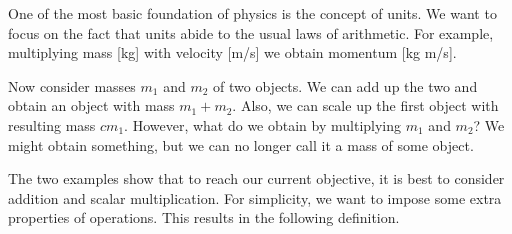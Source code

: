 \begin{example}
    \label{exm:vspintro2}
    One of the most basic foundation of physics is the concept of units.
    We want to focus on the fact that
    units abide to the usual laws of arithmetic.
    For example, multiplying mass [kg] with velocity [m/s]
    we obtain momentum [kg m/s].

    Now consider masses \(m_1\) and \(m_2\) of two objects.
    We can add up the two and obtain an object with mass \(m_1+m_2\).
    Also, we can scale up the first object with resulting mass \(cm_1\).
    However, what do we obtain by multiplying \(m_1\) and \(m_2\)?
    We might obtain something,
    but we can no longer call it a mass of some object.
\end{example}

The two examples show that
to reach our current objective,
it is best to consider addition and scalar multiplication.
For simplicity, we want to impose some extra properties of operations.
This results in the following definition.

